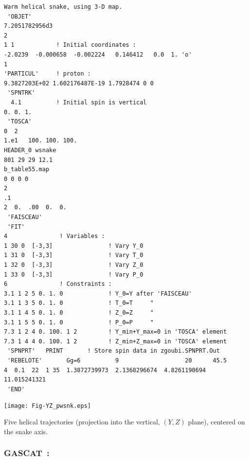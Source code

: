 \begin{minipage}[h]{.60\linewidth}
{\footnotesize
\begin{verbatim}
Warm helical snake, using 3-D map. 
 'OBJET'             
7.2051782956d3        
2                         
1 1            ! Initial coordinates : 
-2.0239  -0.000658  -0.002224   0.146412   0.0  1. 'o'
1 
'PARTICUL'     ! proton : 
9.3827203E+02 1.602176487E-19 1.7928474 0 0           
 'SPNTRK'                 
  4.1          ! Initial spin is vertical                 
0. 0. 1.                  
 'TOSCA'             
0  2                      
1.e1   100. 100. 100.     
HEADER_0 wsnake           
801 29 29 12.1               
b_table55.map
0 0 0 0                   
2                         
.1                        
2  0.  .00  0.  0.        
 'FAISCEAU'          
 'FIT'               
4               ! Variables :          
1 30 0  [-3,3]                ! Vary Y_0
1 31 0  [-3,3]                ! Vary T_0
1 32 0  [-3,3]                ! Vary Z_0
1 33 0  [-3,3]                ! Vary P_0
6               ! Constraints : 
3.1 1 2 5 0. 1. 0             ! Y_0=Y after 'FAISCEAU'
3.1 1 3 5 0. 1. 0             ! T_0=T     "
3.1 1 4 5 0. 1. 0             ! Z_0=Z     "
3.1 1 5 5 0. 1. 0             ! P_0=P     "
7.3 1 2 4 0. 100. 1 2         ! Y_min+Y_max=0 in 'TOSCA' element
7.3 1 4 4 0. 100. 1 2         ! Z_min+Z_max=0 in 'TOSCA' element
 'SPNPRT'   PRINT       ! Store spin data in zgoubi.SPNPRT.Out
 'REBELOTE'       Gg=6          9                   20      45.5      
4  0.1  22  1 35  1.3872739973  2.1368296674  4.8261190694  11.015241321                          
 'END'        
\end{verbatim}
}
\end{minipage}
\begin{minipage}[h]{.3\linewidth}

\centering

\centerline{\texttt{[image: Fig-YZ\_pwsnk.eps]}}

Five helical trajectories (projection into the vertical, $(Y,Z)$ plane), centered on the snake axis. 

\end{minipage}





\newpage

\subsubsection*{GASCAT~: \GASCATTitl} \label{GASCAT}
\medskip

